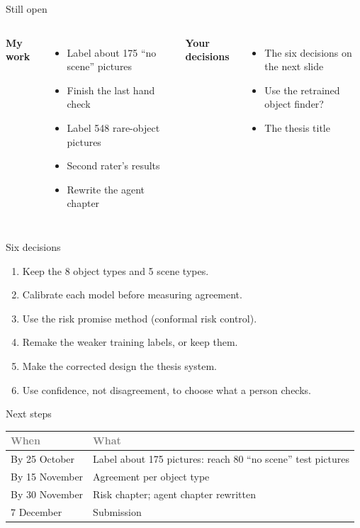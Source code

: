 \documentclass[aspectratio=169,11pt]{beamer}
\newcommand{\h}[1]{\textcolor{grey}{#1}}
\begin{document}
\begin{frame}{Still open}
\begin{columns}[T]
\textbf{My work}
\begin{itemize}\setlength\itemsep{4pt}
  \item Label about 175 ``no scene'' pictures
  \item Finish the last hand check
  \item Label 548 rare-object pictures
  \item Second rater's results
  \item Rewrite the agent chapter
\end{itemize}
\textbf{Your decisions}
\begin{itemize}\setlength\itemsep{4pt}
  \item The six decisions on the next slide
  \item Use the retrained object finder?
  \item The thesis title
\end{itemize}
\end{columns}
\end{frame}

\begin{frame}{Six decisions}
\begin{enumerate}\setlength\itemsep{8pt}
  \item Keep the 8 object types and 5 scene types.
  \item Calibrate each model before measuring agreement.
  \item Use the risk promise method (conformal risk control).
  \item Remake the weaker training labels, or keep them.
  \item Make the corrected design the thesis system.
  \item Use confidence, not disagreement, to choose what a person checks.
\end{enumerate}
\end{frame}

\begin{frame}{Next steps}
\begin{tabular}{@{}L{3.2cm} L{9.6cm}@{}}
\toprule
\h{When} & \h{What}\\
\midrule
By 25 October & Label about 175 pictures: reach 80 ``no scene'' test pictures\\
By 15 November & Agreement per object type\\
By 30 November & Risk chapter; agent chapter rewritten\\
7 December & Submission\\
\bottomrule
\end{tabular}
\end{frame}
\end{document}
